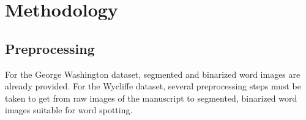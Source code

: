 \documentclass[final]{ukthesis}
\begin{document}
%
%
%





%
%
%
\chapter{Methodology}


%
%
\section{Preprocessing}
For the George Washington dataset, segmented and binarized word images are already provided. For the Wycliffe dataset, several preprocessing steps must be taken to get from raw images of the manuscript to segmented, binarized word images suitable for word spotting. 
\end{document}
